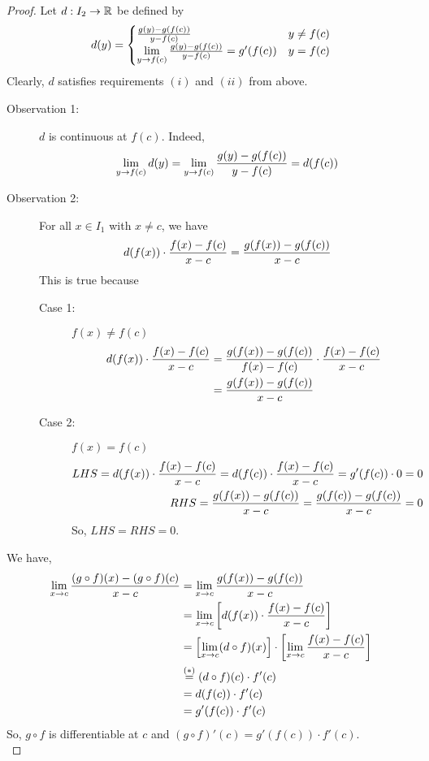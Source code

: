 \begin{proof} \leavevmode
    Let $d:I_2 \to \mathbb{R}$ be defined by
    \begin{align*}
        d(y) = \begin{cases}
            \frac{g(y) - g(f(c))}{y - f(c)} &y \not = f(c) \\
            \lim \limits_{y \to f(c)} \frac{g(y) - g(f(c))}{y - f(c)} = g'(f(c)) &y = f(c)
        \end{cases}
    \end{align*}
    Clearly, $d$ satisfies requirements $(i)$ and $(ii)$ from above.
    \begin{description}
        \item[Observation 1:] $d$ is continuous at $f(c)$. Indeed,
        $$
        \lim \limits_{y \to f(c)} d(y) = \lim \limits_{y \to f(c)} \frac{g(y) - g(f(c))}{y - f(c)} = d(f(c))
        $$

        \item[Observation 2:] For all $x \in I_1$ with $x \not = c$, we have 
        $$
        d(f(x)) \cdot \frac{f(x) - f(c)}{x - c} = \frac{g(f(x)) - g(f(c))}{x - c}
        $$
        This is true because
        \begin{description}
            \item[Case 1:] $f(x) \not = f(c)$
            \begin{align*}
                d(f(x)) \cdot \frac{f(x) - f(c)}{x - c} &= \frac{g(f(x)) - g(f(c))}{f(x) - f(c)} \cdot \frac{f(x) - f(c)}{x - c} \\ 
                &= \frac{g(f(x)) - g(f(c))}{x - c}
            \end{align*} 
            \item[Case 2:] $f(x) = f(c)$
            \begin{align*}
                LHS = d(f(x)) \cdot \frac{f(x) - f(c)}{x - c} = d(f(c)) \cdot \frac{f(x) - f(c)}{x - c} = g'(f(c)) \cdot 0 = 0 \\
                RHS = \frac{g(f(x)) - g(f(c))}{x - c} =\frac{g(f(c)) - g(f(c))}{x - c} = 0
            \end{align*}
            So, $LHS=RHS=0$.
        \end{description}
    \end{description}
    We have,
    \begin{align*}
        \lim \limits_{x \to c} \frac{(g\circ f)(x) - (g\circ f)(c)}{x-c} &= \lim \limits_{x \to c} \frac{g(f(x)) - g(f(c))}{x - c} \\
        &= \lim \limits_{x \to c}\left[d(f(x))\cdot \frac{f(x) - f(c)}{x - c}\right] \\
        &= \left[\lim \limits_{x \to c}(d\circ f)(x)\right]\cdot \left[\lim \limits_{x \to c} \frac{f(x) - f(c)}{x-c}\right] \\ 
        &\overset{(*)}{=}(d\circ f)(c) \cdot f'(c) \\
        &= d(f(c)) \cdot f'(c) \\
        &= g'(f(c)) \cdot f'(c)
    \end{align*}
    So, $g\circ f$ is differentiable at $c$ and $(g\circ f)'(c) = g'(f(c)) \cdot f'(c)$. \\


\end{proof}
